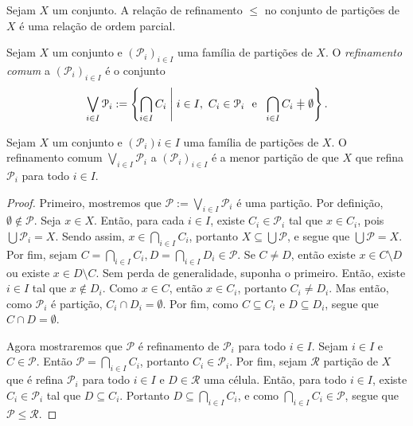 \begin{proposition}
Sejam $X$ um conjunto. A relação de refinamento $\leq$ no conjunto de partições de $X$ é uma relação de ordem parcial.
\end{proposition}

\begin{definition}
Sejam $X$ um conjunto e $(\mathcal P_i)_{i \in I}$ uma família de partições de $X$. O \emph{refinamento comum} a $(\mathcal P_i)_{i \in I}$ é o conjunto
	\begin{equation*}
	\bigvee_{i \in I} \mathcal P_i := \set{\bigcap_{i \in I} C_i}{i \in I,\  C_i \in \mathcal P_i \text{\ \ e\ \ } \bigcap_{i \in I} C_i \neq \emptyset}.
	\end{equation*}
\end{definition}

\begin{proposition}
Sejam $X$ um conjunto e $(\mathcal P_i){i \in I}$ uma família de partições de $X$. O refinamento comum $\bigvee_{i \in I} \mathcal P_i$ a $(\mathcal P_i)_{i \in I}$ é a menor partição de que $X$ que refina $\mathcal P_i$ para todo $i \in I$.
\end{proposition}
\begin{proof}
Primeiro, mostremos que $\mathcal P := \bigvee_{i \in I} \mathcal P_i$ é uma partição. Por definição, $\emptyset \notin \mathcal P$. Seja $x \in X$. Então, para cada $i \in I$, existe $C_i \in \mathcal P_i$ tal que $x \in C_i$, pois $\bigcup \mathcal P_i = X$. Sendo assim, $x \in \bigcap_{i \in I} C_i$, portanto $X \subseteq \bigcup \mathcal P$, e segue que $\bigcup \mathcal P = X$. Por fim, sejam $C=\bigcap_{i \in I} C_i, D=\bigcap_{i \in I} D_i \in \mathcal P$. Se $C \neq D$, então existe $x \in C\setminus D$ ou existe $x \in D \setminus C$. Sem perda de generalidade, suponha o primeiro. Então, existe $i \in I$ tal que $x \notin D_i$. Como $x \in C$, então $x \in C_i$, portanto $C_i \neq D_i$. Mas então, como $\mathcal P_i$ é partição, $C_i \cap D_i = \emptyset$. Por fim, como $C \subseteq C_i$ e $D \subseteq D_i$, segue que $C \cap D = \emptyset$.

Agora mostraremos que $\mathcal P$ é refinamento de $\mathcal P_i$ para todo $i \in I$. Sejam $i \in I$ e $C \in \mathcal P$. Então $\mathcal P=\bigcap_{i \in I} C_i$, portanto $C_i \in \mathcal P_i$. Por fim, sejam $\mathcal R$ partição de $X$ que é refina $\mathcal P_i$ para todo $i \in I$ e $D \in \mathcal R$ uma célula. Então, para todo $i \in I$, existe $C_i \in \mathcal P_i$ tal que $D \subseteq C_i$. Portanto $D \subseteq \bigcap_{i \in I} C_i$, e como $\bigcap_{i \in I} C_i \in \mathcal P$, segue que $\mathcal P \leq \mathcal R$.
\end{proof}


